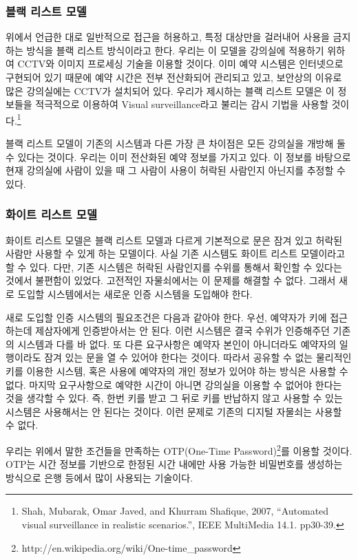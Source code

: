 \documentclass[11pt,a4paper]{article}
\begin{document}
\subsubsection{블랙 리스트 모델}
위에서 언급한 대로 일반적으로 접근을 허용하고, 특정 대상만을 걸러내어 사용을
금지하는 방식을 블랙 리스트 방식이라고 한다. 우리는 이 모델을 강의실에 적용하기
위하여 CCTV와 이미지 프로세싱 기술을 이용할 것이다. 이미 예약 시스템은
인터넷으로 구현되어 있기 때문에 예약 시간은 전부 전산화되어 관리되고 있고,
보안상의 이유로 많은 강의실에는 CCTV가 설치되어 있다. 우리가 제시하는 블랙
리스트 모델은 이 정보들을 적극적으로 이용하여 Visual surveillance라고 불리는
감시 기법을 사용할 것이다.\footnote{Shah, Mubarak, Omar Javed, and Khurram Shafique,
2007, ``Automated visual surveillance in realistic scenarios.'',
IEEE MultiMedia 14.1. pp30-39.}

블랙 리스트 모델이 기존의 시스템과 다른 가장 큰 차이점은 모든 강의실을 개방해
둘 수 있다는 것이다. 우리는 이미 전산화된 예약 정보를 가지고 있다. 이 정보를
바탕으로 현재 강의실에 사람이 있을 때 그 사람이 사용이 허락된 사람인지 아닌지를
추정할 수 있다.

\subsubsection{화이트 리스트 모델}
화이트 리스트 모델은 블랙 리스트 모델과 다르게 기본적으로 문은 잠겨 있고 허락된
사람만 사용할 수 있게 하는 모델이다. 사실 기존 시스템도 화이트 리스트
모델이라고 할 수 있다. 다만, 기존 시스템은 허락된 사람인지를 수위를 통해서
확인할 수 있다는 것에서 불편함이 있었다. 고전적인 자물쇠에서는 이 문제를 해결할
수 없다. 그래서 새로 도입할 시스템에서는 새로운 인증 시스템을 도입해야 한다.

새로 도입할 인증 시스템의 필요조건은 다음과 같아야 한다. 우선, 예약자가 키에
접근하는데 제삼자에게 인증받아서는 안 된다. 이런 시스템은 결국 수위가
인증해주던 기존의 시스템과 다를 바 없다. 또 다른 요구사항은 예약자 본인이
아니더라도 예약자의 일행이라도 잠겨 있는 문을 열 수 있어야 한다는 것이다.
따라서 공유할 수 없는 물리적인 키를 이용한 시스템, 혹은 사용에 예약자의 개인
정보가 있어야 하는 방식은 사용할 수 없다. 마지막 요구사항으로 예약한 시간이
아니면 강의실을 이용할 수 없어야 한다는 것을 생각할 수 있다. 즉, 한번 키를 받고
그 뒤로 키를 반납하지 않고 사용할 수 있는 시스템은 사용해서는 안 된다는 것이다.
이런 문제로 기존의 디지털 자물쇠는 사용할 수 없다.

우리는 위에서 말한 조건들을 만족하는 OTP(One-Time Password)\footnote{
http://en.wikipedia.org/wiki/One-time\_password}를 이용할 것이다.
OTP는 시간 정보를 기반으로 한정된 시간 내에만 사용 가능한 비밀번호를 생성하는
방식으로 은행 등에서 많이 사용되는 기술이다.
\end{document}
